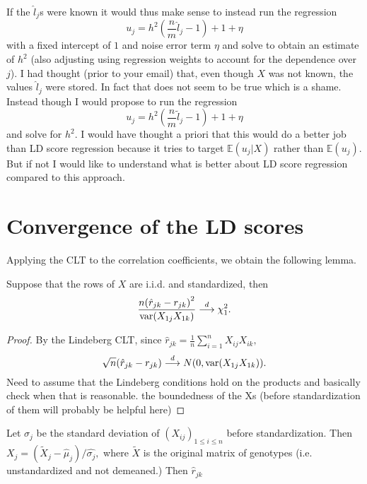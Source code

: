 \noindent If the $ \hat{l}_j $s were known it would thus make sense to instead run the regression
\begin{equation*}
	u_j = h^2\left(\frac{n}{m}\hat{l}_j - 1\right) + 1 + \eta
\end{equation*}
with a fixed intercept of $ 1 $ and noise error term $ \eta $ and solve to obtain an estimate of $ h^2$ (also adjusting using regression weights to account for the dependence over $ j $). I had thought (prior to your email) that, even though $ X  $ was not known, the values $ \hat{l}_j $ were stored. In fact that does not seem to be true which is a shame. Instead though I would propose to run the regression 
\begin{equation*}
u_j = h^2\left(\frac{n}{m}\tilde{l}_j - 1\right) + 1 + \eta
\end{equation*} 
and solve for $ h^2. $ I would have thought a priori that this would do a better job than LD score regression because it tries to target $ \mathbb{E}(u_j|X) $ rather than $ \mathbb{E}(u_j) $. But if not I would like to understand what is better about LD score regression compared to this approach.

\section{Convergence of the LD scores}
Applying the CLT to the correlation coefficients, we obtain the following lemma.
\begin{lemma}
	Suppose that the rows of $ X $ are i.i.d. and standardized, then 
	\begin{equation*}
		\frac{n\left(\hat{r}_{jk} - r_{jk}\right)^2}{\var(X_{1j}X_{1k})} \convd \chi^2_1.
	\end{equation*}
\end{lemma}
\begin{proof}
	By the Lindeberg CLT, since $ \hat{r}_{jk} = \frac{1}{n}\sum_{i = 1}^n X_{ij}X_{ik}, $
	\begin{equation*}
		\sqrt{n}(\hat{r}_{jk} - r_{jk}) \overset{d}{\longrightarrow} N(0, \text{var}(X_{1j}X_{1k}) ).
	\end{equation*}
	Need to assume that the Lindeberg conditions hold on the products and basically check when that is reasonable. the boundedness of the Xs (before standardization of them will probably be helpful here)
\end{proof}

\begin{lemma}
	Let $ \sigma_j $ be the standard deviation of $ (X_{ij})_{1\leq i \leq n} $ before standardization. Then $ X_j = (\tilde{X}_j - \hat{\mu}_j)/\hat{\sigma_j},$ where $ \tilde{X} $ is the original matrix of genotypes (i.e. unstandardized and not demeaned.) Then $ \hat{r}_{jk} $ 
\end{lemma}

